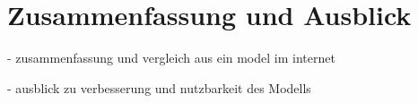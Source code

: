 \documentclass[12pt]{scrreprt}
\begin{document}
\newpage
\chapter{Zusammenfassung und Ausblick}

- zusammenfassung und vergleich aus ein model im internet






- ausblick zu verbesserung und nutzbarkeit des Modells




















\cleardoubleoddpage




\cleardoublepage
	
\end{document}
